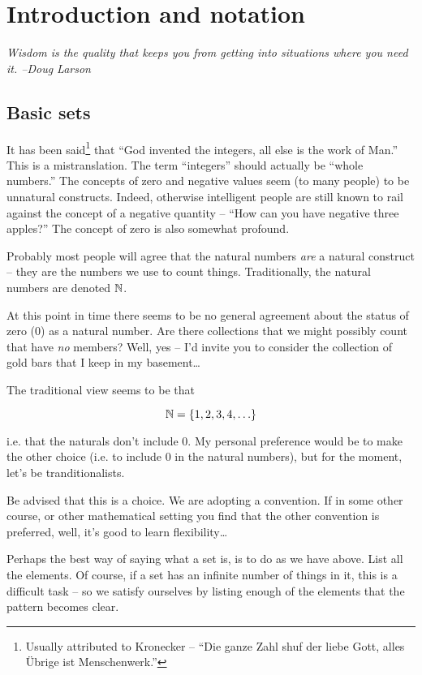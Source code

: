 
\chapter{Introduction and notation}
\label{ch:intro}

{\em Wisdom is the quality that keeps you from getting into situations where you need it.  --Doug Larson}

\section{Basic sets}
\label{sec:basic}

It has been said\footnote{Usually attributed to 
Kronecker -- ``Die ganze Zahl shuf der liebe Gott, alles \"{U}brige 
ist Menschenwerk.''} that ``God invented
the integers, all else is the work of Man.''  This is 
a mistranslation.  The term ``integers'' should
actually be ``whole numbers.''  The concepts of zero and negative 
values seem (to many people) to be unnatural constructs.  Indeed, otherwise
intelligent people are still known to rail against the concept of a
negative quantity -- ``How can you have negative three apples?'' 
The concept of zero is also somewhat profound.

Probably most people will agree that the 
 natural numbers {\em are} a natural construct -- they are the numbers we use to count things.  Traditionally, the natural numbers are denoted ${\mathbb N}$.

At this point in time there seems to be no general agreement about the status
of zero ($0$) as a natural number.  Are there collections that we might possibly
count that have \emph{no} members?  Well, yes -- I'd invite you to consider the collection of gold bars that I keep in my basement\ldots

The traditional view seems to be that 

\[ {\mathbb N} = \{1, 2, 3, 4, \ldots \} \]

\noindent i.e. that the naturals don't include 0.  My personal 
preference would be to make the other choice (i.e. to include $0$
in the natural numbers), but for the moment, let's be tranditionalists.

\noindent Be advised that this is a choice.  We are adopting a 
convention.  If in some other course, or other mathematical setting 
you find that the other convention is preferred, well, it's good to
learn flexibility\ldots

Perhaps the best way of saying what a set is, is to do as we 
have above.  List all the elements.  Of course, if a set has an
infinite number of things in it, this is a difficult task -- so
we satisfy ourselves by listing enough of the elements that the
pattern becomes clear.

